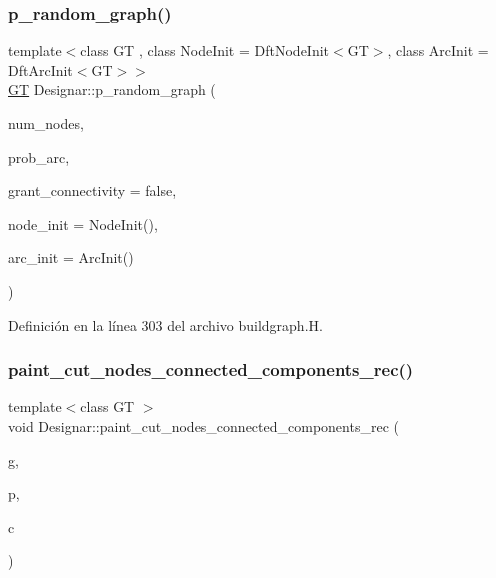 \subsubsection{\texorpdfstring{p\+\_\+random\+\_\+graph()}{p\_random\_graph()}\hspace{0.1cm}{\footnotesize\ttfamily [2/2]}}
{\footnotesize\ttfamily template$<$class GT , class Node\+Init  = Dft\+Node\+Init$<$\+G\+T$>$, class Arc\+Init  = Dft\+Arc\+Init$<$\+G\+T$>$$>$ \\
\hyperlink{demo-buildgraph_8_c_a3001c40d2c31ca87ed96cd7d1334a55e}{GT} Designar\+::p\+\_\+random\+\_\+graph (\begin{DoxyParamCaption}\item[{\hyperlink{namespace_designar_aa72662848b9f4815e7bf31a7cf3e33d1}{nat\+\_\+t}}]{num\+\_\+nodes,  }\item[{\hyperlink{namespace_designar_aca2c32af26808dbec1f3a3071fad25ce}{real\+\_\+t}}]{prob\+\_\+arc,  }\item[{bool}]{grant\+\_\+connectivity = {\ttfamily false},  }\item[{Node\+Init \&\&}]{node\+\_\+init = {\ttfamily NodeInit()},  }\item[{Arc\+Init \&\&}]{arc\+\_\+init = {\ttfamily ArcInit()} }\end{DoxyParamCaption})}



Definición en la línea 303 del archivo buildgraph.\+H.

\mbox{\label{namespace_designar_aba19bd6f648fd502d1dcbcc37d1edfda}} 
\subsubsection{\texorpdfstring{paint\+\_\+cut\+\_\+nodes\+\_\+connected\+\_\+components\+\_\+rec()}{paint\_cut\_nodes\_connected\_components\_rec()}}
{\footnotesize\ttfamily template$<$class GT $>$ \\
void Designar\+::paint\+\_\+cut\+\_\+nodes\+\_\+connected\+\_\+components\+\_\+rec (\begin{DoxyParamCaption}\item[{\hyperlink{demo-buildgraph_8_c_a3001c40d2c31ca87ed96cd7d1334a55e}{GT} \&}]{g,  }\item[{\hyperlink{namespace_designar_a5af326c65aa2bd26b26c410f2030d09e}{Node}$<$ \hyperlink{demo-buildgraph_8_c_a3001c40d2c31ca87ed96cd7d1334a55e}{GT} $>$ \&}]{p,  }\item[{\hyperlink{namespace_designar_a9d113d66a39e82b73727c72cd3a52f73}{lint\+\_\+t}}]{c }\end{DoxyParamCaption})}



